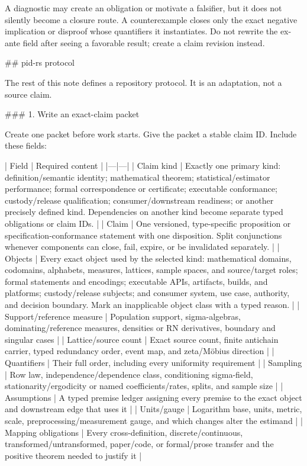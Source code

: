 \documentclass[11pt]{article}
\begin{document}
\begin{markdown}
A diagnostic may create an obligation or motivate a falsifier, but it does not silently become a
closure route. A counterexample closes only the exact negative implication or disproof whose
quantifiers it instantiates. Do not rewrite the ex-ante field after seeing a favorable result;
create a claim revision instead.

## pid-rs protocol

The rest of this note defines a repository protocol. It is an adaptation, not a source claim.

### 1. Write an exact-claim packet

Create one packet before work starts. Give the packet a stable claim ID. Include these fields:

| Field | Required content |
|---|---|
| Claim kind | Exactly one primary kind: definition/semantic identity; mathematical theorem; statistical/estimator performance; formal correspondence or certificate; executable conformance; custody/release qualification; consumer/downstream readiness; or another precisely defined kind. Dependencies on another kind become separate typed obligations or claim IDs. |
| Claim | One versioned, type-specific proposition or specification-conformance statement with one disposition. Split conjunctions whenever components can close, fail, expire, or be invalidated separately. |
| Objects | Every exact object used by the selected kind: mathematical domains, codomains, alphabets, measures, lattices, sample spaces, and source/target roles; formal statements and encodings; executable APIs, artifacts, builds, and platforms; custody/release subjects; and consumer system, use case, authority, and decision boundary. Mark an inapplicable object class with a typed reason. |
| Support/reference measure | Population support, sigma-algebras, dominating/reference measures, densities or RN derivatives, boundary and singular cases |
| Lattice/source count | Exact source count, finite antichain carrier, typed redundancy order, event map, and zeta/Möbius direction |
| Quantifiers | Their full order, including every uniformity requirement |
| Sampling | Row law, independence/dependence class, conditioning sigma-field, stationarity/ergodicity or named coefficients/rates, splits, and sample size |
| Assumptions | A typed premise ledger assigning every premise to the exact object and downstream edge that uses it |
| Units/gauge | Logarithm base, units, metric, scale, preprocessing/measurement gauge, and which changes alter the estimand |
| Mapping obligations | Every cross-definition, discrete/continuous, transformed/untransformed, paper/code, or formal/prose transfer and the positive theorem needed to justify it |

\end{markdown}
\end{document}
